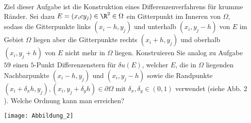 \begin{exercise}
  Ziel dieser Aufgabe ist die Konstruktion eines Differenzenverfahrens für krumme
  Ränder. Sei dazu $E =(x_ic y_j) \in \R^2 \in \Omega$ ein Gitterpunkt im Inneren
  von $\Omega$, sodass die Gitterpunkte links $(x_i -h, y_j)$ und unterhalb
  $(x_i,y_j -h)$ von $E$ im Gebiet $\Omega$ liegen aber die Gitterpunkte rechts
  $(x_i + h, y_j)$ und oberhalb $(x_i, y_j + h)$ von $E$ nicht mehr in $\Omega$ liegen.
  Konstruieren Sie analog zu Aufgabe $59$ einen $5$-Punkt Differenzenstern für
  $\delta u(E)$, welcher $E$, die in $\Omega$ liegenden Nachbarpunkte $(x_i -h, y_j)$
  und $(x_i, y_j -h)$ sowie die Randpunkte
  $(x_i + \delta_x h , y_j), (x_i, y_j + \delta_y h) \in \partial \Omega$ mit
  $\delta_x, \delta_y \in (0,1)$ verwendet (siehe Abb. $2$). Welche Ordnung kann man
  erreichen?

  \texttt{[image: Abbildung\_2]}
\end{exercise}

